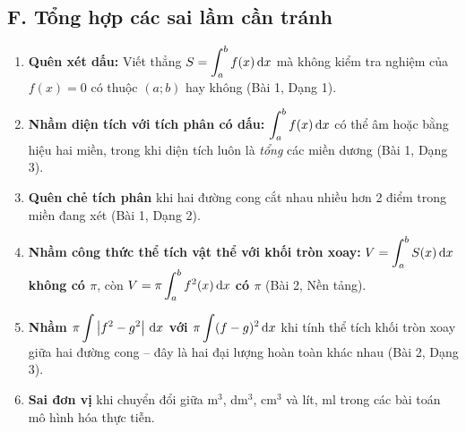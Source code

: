 \subsection*{F. Tổng hợp các sai lầm cần tránh}

\begin{hopchuy}
\begin{enumerate}[leftmargin=1cm]
  \item \textbf{Quên xét dấu:} Viết thẳng $S=\displaystyle\int_a^b f(x)\,\mathrm{d}x$ mà không kiểm tra nghiệm của $f(x)=0$ có thuộc $(a;b)$ hay không (Bài 1, Dạng 1).
  \item \textbf{Nhầm diện tích với tích phân có dấu:} $\displaystyle\int_a^b f(x)\,\mathrm{d}x$ có thể âm hoặc bằng hiệu hai miền, trong khi diện tích luôn là \emph{tổng} các miền dương (Bài 1, Dạng 3).
  \item \textbf{Quên chẻ tích phân} khi hai đường cong cắt nhau nhiều hơn 2 điểm trong miền đang xét (Bài 1, Dạng 2).
  \item \textbf{Nhầm công thức thể tích vật thể với khối tròn xoay:} $V=\displaystyle\int_a^b S(x)\,\mathrm{d}x$ \textbf{không có $\pi$}, còn $V=\pi\displaystyle\int_a^b f^2(x)\,\mathrm{d}x$ \textbf{có $\pi$} (Bài 2, Nền tảng).
  \item \textbf{Nhầm $\pi\displaystyle\int\left| f^2-g^2 \right|\,\mathrm{d}x$ với $\pi\displaystyle\int(f-g)^2\,\mathrm{d}x$} khi tính thể tích khối tròn xoay giữa hai đường cong -- đây là hai đại lượng hoàn toàn khác nhau (Bài 2, Dạng 3).
  \item \textbf{Sai đơn vị} khi chuyển đổi giữa m$^3$, dm$^3$, cm$^3$ và lít, ml trong các bài toán mô hình hóa thực tiễn.
\end{enumerate}
\end{hopchuy}

\newpage
